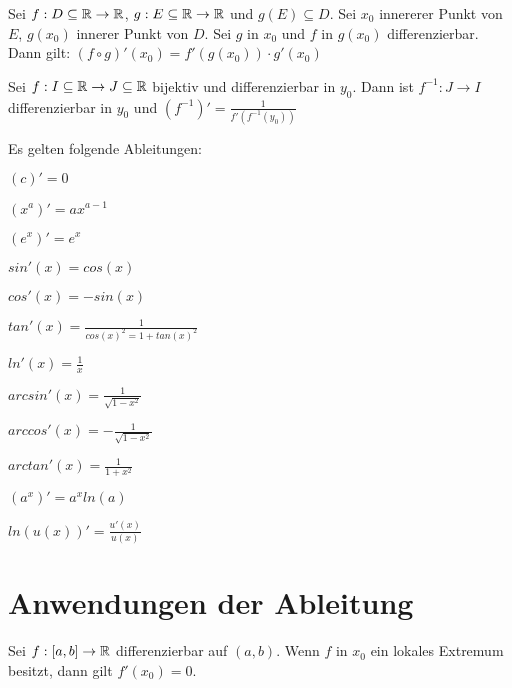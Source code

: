 \documentclass[]{article}
\begin{document}
\begin{satz}[Kettenregel]
	Sei $f :  D \subseteq \mathbb{R} \rightarrow \mathbb{R}$, $g : E \subseteq \mathbb{R} \rightarrow \mathbb{R}$ und $g(E) \subseteq D$. Sei $x_0$ innererer Punkt von $E$, $g(x_0)$ innerer Punkt von $D$. Sei $g$ in $x_0$ und $f$ in $g(x_0)$ differenzierbar. Dann gilt: $(f \circ g)'(x_0) = f'(g(x_0)) \cdot g'(x_0)$
 \end{satz}

\begin{satz}
	Sei $f : I \subseteq \mathbb{R} \rightarrow J \subseteq \mathbb{R} $ bijektiv und differenzierbar in $y_0$. Dann ist $f^{-1} : J \rightarrow I$ differenzierbar in $y_0$ und $(f^{-1})'=\frac{1}{f'(f^{-1}(y_0))}$
\end{satz}

\begin{satz}
	Es gelten folgende Ableitungen:
	\begin{multicols}{2}
		\begin{description}[noitemsep]
			\item $(c)' = 0$
			\item $(x^a)'=ax^{a-1}$
			\item $(e^x)'=e^x$
			\item $sin'(x) = cos(x)$
			\item $cos'(x) = -sin(x)$
			\item $tan'(x) = \frac{1}{cos(x)^2 = 1 + tan(x)^2}$
			\item $ln'(x) = \frac{1}{x}$
			\item $arcsin'(x) = \frac{1}{\sqrt{1 -x^2}}$	
			\item $arccos'(x) = - \frac{1}{\sqrt{1 - x^2}}$	
			\item $arctan'(x) = \frac{1}{1 + x^2}$
			\item $(a^x)' = a^x ln(a)$
			\item $ln(u(x))'=\frac{u'(x)}{u(x)}$
		\end{description}
	\end{multicols}
\end{satz}

\section{Anwendungen der Ableitung}

\begin{satz}
	Sei $f : [a,b] \rightarrow \mathbb{R}$ differenzierbar auf $(a,b)$. Wenn $f$ in $x_0$ ein lokales Extremum besitzt, dann gilt $f'(x_0) = 0$.
\end{satz}
\end{document}
